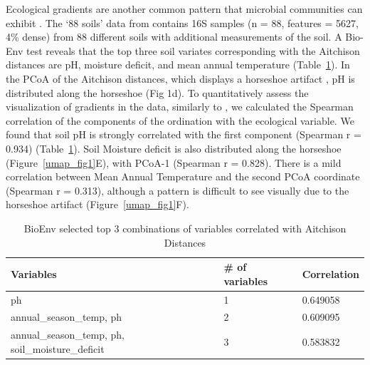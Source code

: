 Ecological gradients are another common pattern that microbial communities can exhibit \cite{Kuczynski2010-gu}. The `88 soils' data from \cite{Lauber2009-jo} contains 16S samples (n = 88, features = 5627, 4\% dense) from 88 different soils with additional measurements of the soil. A Bio-Env test \cite{Clarke1993-ad} reveals that the top three soil variates corresponding with the Aitchison distances are pH, moisture deficit, and mean annual temperature (Table~\ref{umap_table2}). In the PCoA of the Aitchison distances, which displays a horseshoe artifact \cite{Morton2017-bs,Diaconis2008-ah}, pH is distributed along the horseshoe (Fig 1d). To quantitatively assess the visualization of gradients in the data, similarly to \cite{Kuczynski2010-gu}, we calculated the Spearman correlation of the components of the ordination with the ecological variable. We found that soil pH is strongly correlated with the first component (Spearman r = 0.934) (Table~\ref{umap_table2}). Soil Moisture deficit is also distributed along the horseshoe (Figure~\ref{umap_fig1}E), with PCoA-1 (Spearman r = 0.828). There is a mild correlation between Mean Annual Temperature and the second PCoA coordinate (Spearman r = 0.313), although a pattern is difficult to see visually due to the horseshoe artifact (Figure~\ref{umap_fig1}F).

\begin{table}[]
\caption{BioEnv selected top 3 combinations of variables correlated with Aitchison Distances}
\label{umap_table2}
\centering
\begin{tabular}{lll} \hline
Variables & \# of variables & Correlation \\ \hline
ph & 1 & 0.649058 \\
annual\_season\_temp, ph & 2 & 0.609095 \\
annual\_season\_temp, ph, soil\_moisture\_deficit & 3 & 0.583832 \\ \hline
\end{tabular}
\end{table}

